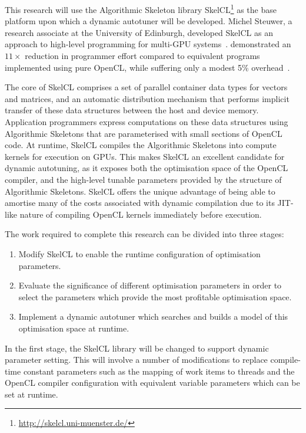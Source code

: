 This research will use the Algorithmic Skeleton library
SkelCL\footnote{\url{http://skelcl.uni-muenster.de/}} as the base
platform upon which a dynamic autotuner will be developed. Michel
Steuwer, a research associate at the University of Edinburgh,
developed SkelCL as an approach to high-level programming for
multi-GPU systems~\cite{Steuwer2011,
  Steuwer2013a}. \citeauthor{Steuwer2012} demonstrated an $11\times$
reduction in programmer effort compared to equivalent programs
implemented using pure OpenCL, while suffering only a modest 5\%
overhead~\cite{Steuwer2012}.

The core of SkelCL comprises a set of parallel container data types
for vectors and matrices, and an automatic distribution mechanism that
performs implicit transfer of these data structures between the host
and device memory. Application programmers express computations on
these data structures using Algorithmic Skeletons that are
parameterised with small sections of OpenCL code. At runtime, SkelCL
compiles the Algorithmic Skeletons into compute kernels for execution
on GPUs. This makes SkelCL an excellent candidate for dynamic
autotuning, as it exposes both the optimisation space of the OpenCL
compiler, and the high-level tunable parameters provided by the
structure of Algorithmic Skeletons.
SkelCL offers the unique advantage of being able to amortise many of
the costs associated with dynamic compilation due to its JIT-like
nature of compiling OpenCL kernels immediately before execution.

The work required to complete this research can be divided into three
stages:

\begin{enumerate}
\item Modify SkelCL to enable the runtime configuration of
optimisation parameters.
\item Evaluate the significance of different optimisation parameters
in order to select the parameters which provide the most profitable
optimisation space.
\item Implement a dynamic autotuner which searches and builds a model
of this optimisation space at runtime.
\end{enumerate}

In the first stage, the SkelCL library will be changed to support
dynamic parameter setting. This will involve a number of modifications
to replace compile-time constant parameters such as the mapping of
work items to threads and the OpenCL compiler configuration with
equivalent variable parameters which can be set at runtime.

